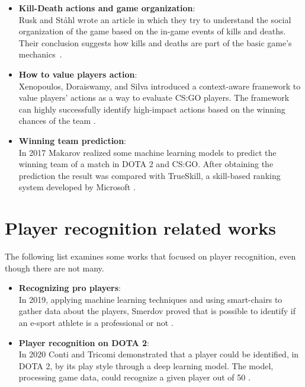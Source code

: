 \begin{itemize}
		\item \textbf{Kill-Death actions and game organization}:\\
			Rusk and Ståhl wrote an article in which they try to understand the social organization of the game based on the in-game events of kills and deaths. 
			Their conclusion suggests how kills and deaths are part of the basic game's mechanics~\cite{2729533}.
			
		\item \textbf{How to value players action}:\\
			Xenopoulos, Doraiswamy, and Silva introduced a context-aware framework to value players' actions as a way to evaluate CS:GO players.
			The framework can highly successfully identify high-impact actions based on the winning chances of the team \cite{9378154}.
				
		\item \textbf{Winning team prediction}:\\
			In 2017 Makarov realized some machine learning models to predict the winning team of a match in DOTA 2 and CS:GO. 
			After obtaining the prediction the result was compared with TrueSkill, a skill-based ranking system developed by Microsoft \cite{10.1007/978-3-319-73013-4_17}.
				
	\end{itemize}
		
\section{\label{sec:plrec}Player recognition related works}
	
	The following list examines some works that focused on player recognition, even though there are not many. 
	\begin{itemize}
	
		\item \textbf{Recognizing pro players}: \\
			In 2019, applying machine learning techniques and using smart-chairs to gather data about the players, Smerdov proved that is possible to identify if an e-sport athlete is a professional or not \cite{8767295}. 
		
		\item \textbf{Player recognition on DOTA 2}:\\
			In 2020 Conti and Tricomi demonstrated that a player could be identified, in DOTA 2, by its play style through a deep learning model. 
			The model, processing game data, could recognize a given player out of 50 \cite{10.1007/978-3-030-62974-8_22}.
		
	\end{itemize}
		
